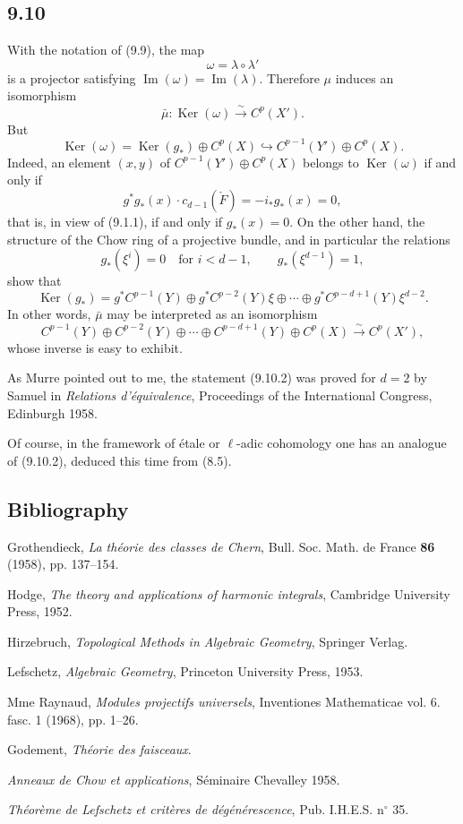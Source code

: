 \documentclass[11pt]{article}
\providecommand{\Ker}{\operatorname{Ker}}
\providecommand{\Ker}{\operatorname{Ker}}
\providecommand{\Ker}{\operatorname{Ker}}
\begin{document}
\subsection*{9.10}

With the notation of (9.9), the map
\[
\omega=\lambda\circ\lambda'
\]
is a projector satisfying $\operatorname{Im}(\omega)=\operatorname{Im}(\lambda)$. Therefore $\mu$ induces an isomorphism
\[
\bar\mu:\Ker(\omega)\xrightarrow{\sim}C^p(X').
\]
But
\[
\Ker(\omega)=\Ker(g_*)\oplus C^p(X)\hookrightarrow C^{p-1}(Y')\oplus C^p(X).
\tag{9.10.1}
\]
Indeed, an element $(x,y)$ of $C^{p-1}(Y')\oplus C^p(X)$ belongs to $\Ker(\omega)$ if and only if
\[
g^*g_*(x)\cdot c_{d-1}(\check F)=-i_*g_*(x)=0,
\]
that is, in view of (9.1.1), if and only if $g_*(x)=0$. On the other hand, the structure of the Chow ring of a projective bundle, and in particular the relations
\[
g_*(\xi^i)=0\quad\text{for }i<d-1,\qquad g_*(\xi^{d-1})=1,
\]
show that
\[
\Ker(g_*)=g^*C^{p-1}(Y)\oplus g^*C^{p-2}(Y)\xi\oplus\cdots\oplus g^*C^{p-d+1}(Y)\xi^{d-2}.
\]
In other words, $\bar\mu$ may be interpreted as an isomorphism
\[
C^{p-1}(Y)\oplus C^{p-2}(Y)\oplus\cdots\oplus C^{p-d+1}(Y)\oplus C^p(X)
\xrightarrow{\sim}C^p(X'),
\tag{9.10.2}
\]
whose inverse is easy to exhibit.

As Murre pointed out to me, the statement (9.10.2) was proved for $d=2$ by Samuel in \emph{Relations d'équivalence}, Proceedings of the International Congress, Edinburgh 1958.

Of course, in the framework of étale or $\ell$-adic cohomology one has an analogue of (9.10.2), deduced this time from (8.5).

\subsection*{Bibliography}

\begin{enumerate}[label={[\arabic*]}]
\item Grothendieck, \emph{La théorie des classes de Chern}, Bull. Soc. Math. de France \textbf{86} (1958), pp. 137--154.
\item Hodge, \emph{The theory and applications of harmonic integrals}, Cambridge University Press, 1952.
\item Hirzebruch, \emph{Topological Methods in Algebraic Geometry}, Springer Verlag.
\item Lefschetz, \emph{Algebraic Geometry}, Princeton University Press, 1953.
\item Mme Raynaud, \emph{Modules projectifs universels}, Inventiones Mathematicae vol. 6. fasc. 1 (1968), pp. 1--26.
\item[{[TF]}] Godement, \emph{Théorie des faisceaux}.
\item[{[CH]}] \emph{Anneaux de Chow et applications}, Séminaire Chevalley 1958.
\item[{[6]}] \emph{Théorème de Lefschetz et critères de dégénérescence}, Pub. I.H.E.S. n$^\circ$ 35.
\end{enumerate}
\end{document}
